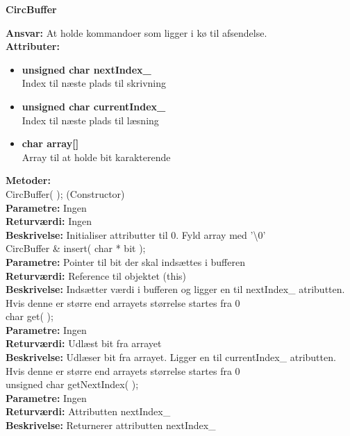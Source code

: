 %
%
{\centering
\textbf{CircBuffer}\par
}
\textbf{Ansvar:} At holde kommandoer som ligger i kø til afsendelse. \\
\textbf{Attributer:}
\begin{itemize}
	\item \textbf{unsigned char nextIndex\_} \\
	Index til næste plads til skrivning
	\item \textbf{unsigned char currentIndex\_} \\
	Index til næste plads til læsning
	\item \textbf{char array[]} \\
	Array til at holde bit karakterende
\end{itemize}

\textbf{Metoder:} \\
CircBuffer( ); (Constructor)\\
\textbf{Parametre:} Ingen \\
\textbf{Returværdi:} Ingen \\
\textbf{Beskrivelse:} Initialiser attributter til 0. Fyld array med '\textbackslash 0' \\

CircBuffer \& insert( char * bit ); \\
\textbf{Parametre:} Pointer til bit der skal indsættes i bufferen \\
\textbf{Returværdi:} Reference til objektet (this) \\
\textbf{Beskrivelse:} Indsætter værdi i bufferen og ligger en til nextIndex\_ atributten. Hvis denne er større end arrayets størrelse startes fra 0\\

char get( ); \\
\textbf{Parametre:} Ingen \\
\textbf{Returværdi:} Udlæst bit fra arrayet \\
\textbf{Beskrivelse:} Udlæser bit fra arrayet. Ligger en til currentIndex\_ atributten. Hvis denne er større end arrayets størrelse startes fra 0\\

unsigned char getNextIndex( ); \\
\textbf{Parametre:} Ingen \\
\textbf{Returværdi:} Attributten nextIndex\_ \\
\textbf{Beskrivelse:} Returnerer attributten nextIndex\_ \\

